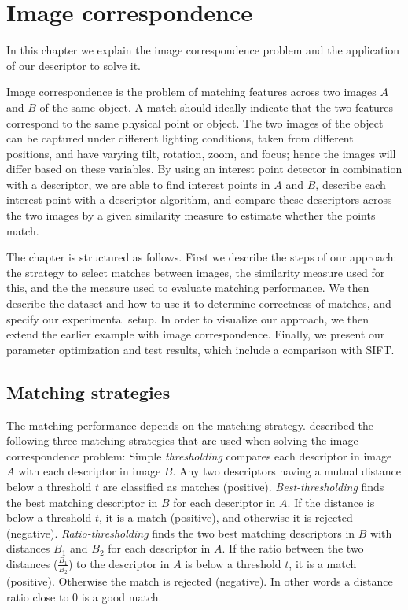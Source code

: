 \documentclass[thesis.tex]{subfiles}
\begin{document}
\chapter{Image correspondence}
\label{sec:ic}
%
In this chapter we explain the image correspondence problem and the application of our descriptor to solve it.

Image correspondence is the problem of matching features across two images $A$ and $B$ of the same object. A match should ideally indicate that the two features correspond to the same physical point or object. The two images of the object can be captured under different lighting conditions, taken from different positions, and have varying tilt, rotation, zoom, and focus; hence the images will differ based on these variables. By using an interest point detector in combination with a descriptor, we are able to find interest points in $A$ and $B$, describe each interest point with a descriptor algorithm, and compare these descriptors across the two images by a given similarity measure to estimate whether the points match.

The chapter is structured as follows. First we describe the steps of our approach: the strategy to select matches between images, the similarity measure used for this, and the the measure used to evaluate matching performance. We then describe the dataset and how to use it to determine correctness of matches, and specify our experimental setup. In order to visualize our approach, we then extend the earlier example with image correspondence. Finally, we present our parameter optimization and test results, which include a comparison with SIFT.
%
\section{Matching strategies}
\label{sec:matching_strategies}
%
The matching performance depends on the matching strategy. \citet{mikolajczyk2005performance} described the following three matching strategies that are used when solving the image correspondence problem:
Simple \emph{thresholding} compares each descriptor in image $A$ with each descriptor in image $B$. Any two descriptors having a mutual distance below a threshold $t$ are classified as matches (positive). \emph{Best-thresholding} finds the best matching descriptor in $B$ for each descriptor in $A$. If the distance is below a threshold $t$, it is a match (positive), and otherwise it is rejected (negative). \emph{Ratio-thresholding} finds the two best matching descriptors in $B$ with distances $B_1$ and $B_2$ for each descriptor in $A$. If the ratio between the two distances ($\frac{B_1}{B_2}$) to the descriptor in $A$ is below a threshold $t$, it is a match (positive). Otherwise the match is rejected (negative). In other words a distance ratio close to 0 is a good match.
\end{document}
